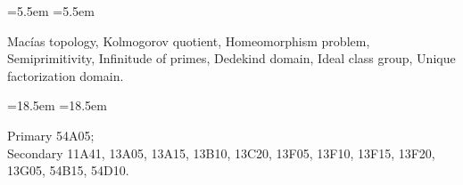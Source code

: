 \documentclass[12pt,reqno,a4paper]{amsart}
\theoremstyle{plain}
\theoremstyle{definition}
\begin{document}
\maketitle
\vspace{-0.5em}
\begin{center}
\begin{minipage}{0.845\textwidth}
    \footnotesize
    \begin{list}{}{
        \leftmargin=5.5em
        =5.5em
         \parsep=0pt \topsep=0pt \itemsep=0pt
    }
      \item[\textit{Keywords:}\hfill] {\raggedright Mac\'ias topology, Kolmogorov quotient, Homeomorphism problem, Semiprimitivity, Infinitude of primes, Dedekind domain, Ideal class group, Unique factorization domain. \par}
    \end{list}

    \vspace{4pt}

    \begin{list}{}{
        \leftmargin=18.5em
        =18.5em
         \parsep=0pt \topsep=0pt \itemsep=0pt
    }
                \item[2020\hspace{1mm}\textit{Mathematics Subject Classification:}\hfill]
{\raggedright Primary 54A05;\\ Secondary 11A41, 13A05, 13A15, 13B10, 13C20, 13F05, 13F10, 13F15, 13F20, 13G05, 54B15, 54D10.\par}
    \end{list}
\end{minipage}
\end{center}
\vspace{1em}
\end{document}

